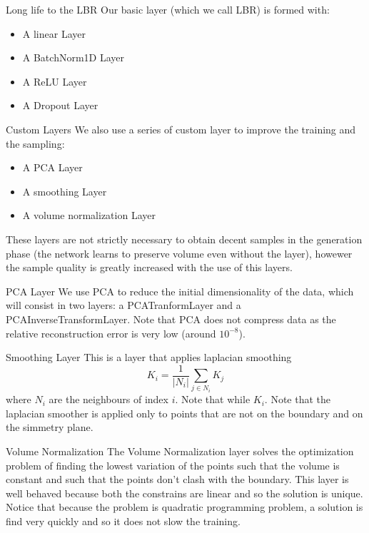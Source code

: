 \documentclass{beamer}
\begin{document}
\begin{frame}{Long life to the LBR}
Our basic layer (which we call LBR) is formed with:
\begin{itemize}
\item A linear Layer
\item A BatchNorm1D Layer
\item A ReLU Layer
\item A Dropout Layer
\end{itemize}
\end{frame}
\begin{frame}{Custom Layers}
We also use a series of custom layer to improve the training and the sampling:
\begin{itemize}
\item A PCA Layer
\item A smoothing Layer
\item A volume normalization Layer
\end{itemize}
These layers are not strictly necessary to obtain decent samples in the generation phase (the network learns to preserve volume even without the layer), howewer the sample quality is greatly increased with the use of this layers.
\end{frame}
\begin{frame}{PCA Layer}
We use PCA to reduce the initial dimensionality of the data, which will consist in two layers: a PCATranformLayer and a PCAInverseTransformLayer. Note that PCA does not compress data as the relative reconstruction error is very low (around $10^{-8}$).
\end{frame}
\begin{frame}{Smoothing Layer}
This is a layer that applies laplacian smoothing $$K_{i}=\frac{1}{|N_{i}|}\sum_{j \in N_{i}} K_{j}$$ where $N_{i}$ are the neighbours of index $i$. Note that while $K_{i}$. Note that the laplacian smoother is applied only to points that are not on the boundary and on the simmetry plane. 
\end{frame}
\begin{frame}{Volume Normalization}
The Volume Normalization layer solves the optimization problem of finding the lowest variation of the points such that the volume is constant and such that the points don't clash with the boundary. This layer is well behaved because both the constrains are linear and so the solution is unique. Notice that because the problem is quadratic programming problem, a solution is find very quickly and so it does not slow the training.
\end{frame}
\end{document}
